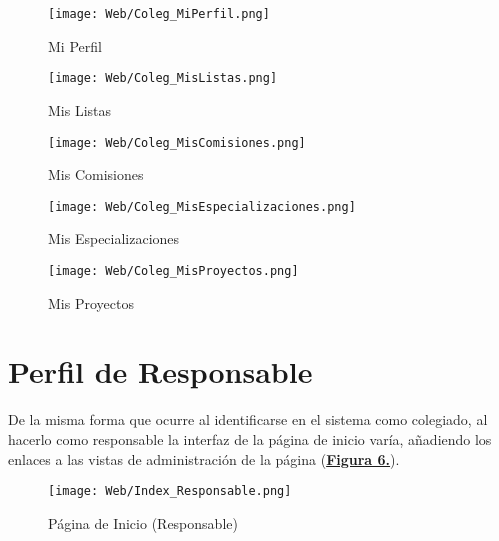 \begin{figure}[!htbp]
  \centering
  \texttt{[image: Web/Coleg\_MiPerfil.png]}
  \caption{Mi Perfil}
  \label{fig:Web_Coleg_MiPerfil}
\end{figure}
\FloatBarrier

\begin{figure}[!htbp]
  \centering
  \texttt{[image: Web/Coleg\_MisListas.png]}
  \caption{Mis Listas}
  \label{fig:Web_Coleg_MisListas}
\end{figure}
\FloatBarrier

\begin{figure}[!htbp]
  \centering
  \texttt{[image: Web/Coleg\_MisComisiones.png]}
  \caption{Mis Comisiones}
  \label{fig:Web_Coleg_MisComisiones}
\end{figure}
\FloatBarrier

\begin{figure}[!htbp]
  \centering
  \texttt{[image: Web/Coleg\_MisEspecializaciones.png]}
  \caption{Mis Especializaciones}
  \label{fig:Web_Coleg_MisEspecializacion}
\end{figure}
\FloatBarrier

\begin{figure}[!htbp]
  \centering
  \texttt{[image: Web/Coleg\_MisProyectos.png]}
  \caption{Mis Proyectos}
  \label{fig:Web_Coleg_MisProyectos}
\end{figure}
\FloatBarrier
\pagebreak


\section{Perfil de Responsable}
\addtocounter{figura_manual}{1} De la misma forma que ocurre al identificarse en el sistema como colegiado, al hacerlo como responsable la interfaz de la página de inicio varía, añadiendo los enlaces a las vistas de administración de la página (\textbf{\hyperref[fig:Web_Index_Responsable]{Figura 6.}}).

\begin{figure}[!htbp]
  \centering
  \texttt{[image: Web/Index\_Responsable.png]}
  \caption{Página de Inicio (Responsable)}
  \label{fig:Web_Index_Responsable}
\end{figure}
\FloatBarrier

